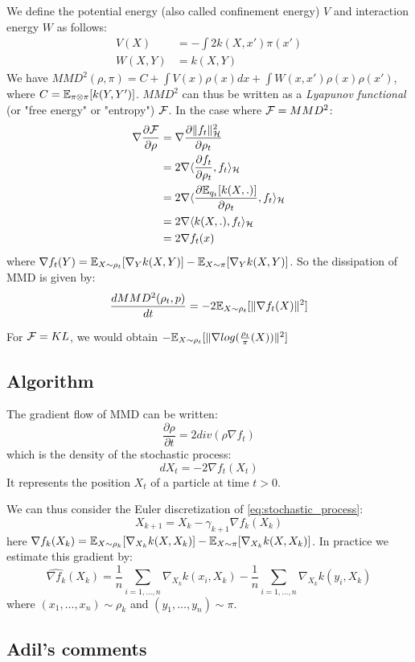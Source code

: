 We define the potential energy (also called confinement energy) $V$ and interaction energy $W$ as follows:
\begin{align}
V(X)&=-\int 2 k(X,x')\pi(x')\\
W(X,Y)&=k(X,Y)
\end{align}
We have $MMD^2(\rho,\pi)=C+ \int V(x) \rho(x)dx + \int W(x,x')\rho(x)\rho(x')$, where $C={{\mathbb E}}_{\pi\otimes \pi}[k(Y,Y')]$. $MMD^2$ can thus be written as a \textit{Lyapunov functional} (or "free energy" or "entropy") ${{\mathcal F}}$.
In the case where ${{\mathcal F}}=MMD^2$:
\begin{align}
\nabla \frac{\partial {{\mathcal F}}}{\partial \rho}&= \nabla \frac{\partial \|f_t\|^2_{{{\mathcal H}}}}{\partial \rho_t}\\
&=2 \nabla \langle \frac{\partial f_t}{\partial \rho_t}, f_t \rangle_{{{\mathcal H}}}\\
&=2 \nabla \langle \frac{\partial {{\mathbb E}}_{q_t}[k(X,.)]}{\partial \rho_t}, f_t \rangle_{{{\mathcal H}}}\\
&=2 \nabla \langle k(X,.), f_t \rangle_{{{\mathcal H}}}\\
&= 2 \nabla f_t(x)
\end{align}
where $\nabla f_t(Y)= {{\mathbb E}}_{X \sim \rho_t}[\nabla_{Y}k(X,Y)] -  {{\mathbb E}}_{X \sim \pi}[\nabla_{Y}k(X,Y)]$. So the dissipation of MMD is given by:  
\begin{equation}
\frac{d MMD^2(\rho_t, p)}{dt}=-2 {{\mathbb E}}_{X \sim \rho_t}[\|\nabla f_t(X)\|^2]
\end{equation}

\begin{remark}
	For ${{\mathcal F}}=KL$, we would obtain $-{{\mathbb E}}_{X \sim \rho_t}[\|\nabla log(\frac{\rho_t}{\pi}(X))\|^2]$
\end{remark}




\subsection{Algorithm}

The gradient flow of MMD can be written:
\begin{equation*}
\frac{\partial \rho}{\partial t}= 2 div(\rho  \nabla f_t)
\end{equation*}
which is the density of the stochastic process:
\begin{equation}\label{eq:stochastic_process}
dX_t=-2\nabla f_t(X_t) 
\end{equation}
It represents the position $X_t$ of a particle at time $t > 0$.


We can thus consider the Euler discretization of \eqref{eq:stochastic_process}:
\begin{equation}\label{eq:discretization}
X_{k+1}=X_k - \gamma_{k+1} \nabla f_k(X_k)
\end{equation}
here $\nabla f_k(X_k)= {{\mathbb E}}_{X \sim \rho_k}[\nabla_{X_k}k(X,X_k)] -  {{\mathbb E}}_{X \sim \pi}[\nabla_{X_k}k(X,X_k)]$.
In practice we estimate this gradient by:
\begin{equation*}
\widehat{\nabla f_k}(X_k)=\frac{1}{n}\sum_{i=1,\dots,n}\nabla_{X_k}k(x_i,X_k) - \frac{1}{n}\sum_{i=1,\dots,n}\nabla_{X_k}k(y_i,X_k)
\end{equation*}
where $(x_1, \dots, x_n)\sim \rho_k$ and $(y_1, \dots, y_n)\sim \pi$.

\subsection{Adil's comments}


